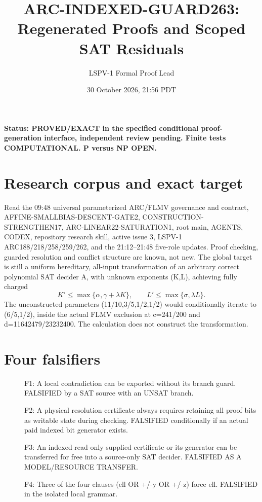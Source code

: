 \documentclass[11pt]{article}
\title{ARC-INDEXED-GUARD263: Regenerated Proofs and Scoped SAT Residuals}
\author{LSPV-1 Formal Proof Lead}
\date{30 October 2026, 21:56 PDT}
\begin{document}
\maketitle
\noindent\textbf{Status: PROVED/EXACT in the specified conditional proof-generation interface, independent review pending. Finite tests COMPUTATIONAL. P versus NP OPEN.}
\section{Research corpus and exact target}
Read the 09:48 universal parameterized ARC/FLMV governance and contract, AFFINE-SMALLBIAS-DESCENT-GATE2, CONSTRUCTION-STRENGTHEN17, ARC-LINEAR22-SATURATION1, root main, AGENTS, CODEX, repository research skill, active issue 3, LSPV-1 ARC188/218/258/259/262, and the 21:12--21:48 five-role updates. Proof checking, guarded resolution and conflict structure are known, not new. The global target is still a uniform hereditary, all-input transformation of an arbitrary correct polynomial SAT decider A, with unknown exponents (K,L), achieving fully charged
\[
K'\le\max\{\alpha,\gamma+\lambda K\},\qquad
L'\le\max\{\sigma,\lambda L\}.
\]
The unconstructed parameters (11/10,3/5,1/2,1/2) would conditionally iterate to (6/5,1/2), inside the actual FLMV exclusion at c=241/200 and d=11642479/23232400. The calculation does not construct the transformation.
\section{Four falsifiers}
\begin{description}
\item[] F1: A local contradiction can be exported without its branch guard. FALSIFIED by a SAT source with an UNSAT branch.
\item[] F2: A physical resolution certificate always requires retaining all proof bits as writable state during checking. FALSIFIED conditionally if an actual paid indexed bit generator exists.
\item[] F3: An indexed read-only supplied certificate or its generator can be transferred for free into a source-only SAT decider. FALSIFIED AS A MODEL/RESOURCE TRANSFER.
\item[] F4: Three of the four clauses (ell OR +/-y OR +/-z) force ell. FALSIFIED in the isolated local grammar.
\end{description}
\end{document}

